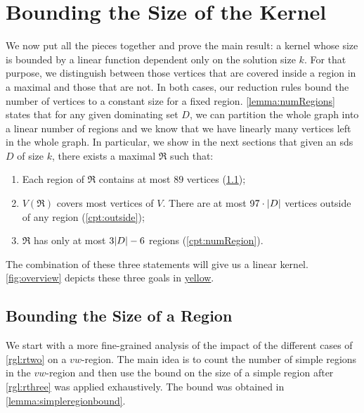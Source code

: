 \section{Bounding the Size of the Kernel}

We now put all the pieces together and prove the main result: a kernel whose size is bounded by a linear function dependent only on the solution size $k$. 
For that purpose, we distinguish between those vertices that are covered inside a region in a maximal \dreg and those that are not. 
In both cases, our reduction rules bound the number of vertices to a constant size for a fixed region.
\cref{lemma:numRegions} states that for any given dominating set $D$, we can partition the whole graph into a linear number of regions and we know that we have linearly many vertices left in the whole graph.
In particular, we show in the next sections that given an sds $D$ of size $k$, there exists a maximal \dreg $\mathfrak{R}$ such that:

\begin{enumerate}[topsep=0pt,itemsep=-1ex,partopsep=1ex,parsep=1ex]
    \item Each region of $\mathfrak{R}$ contains at most $89$ vertices (\cref{chp:sizeRegion});
    \item $V(\mathfrak{R})$ covers most vertices of $V$. There are at most $97 \cdot \abs{D}$ vertices outside of any region (\cref{cpt:outside});
    \item $\mathfrak{R}$ has only at most $3 \abs{D} - 6$ regions (\cref{cpt:numRegion}).
\end{enumerate}

The combination of these three statements will give us a linear kernel. 
\cref{fig:overview} depicts these three goals in {\ul{yellow}}.

\subsection{Bounding the Size of a Region}\label{chp:sizeRegion}

We start with a more fine-grained analysis of the impact of the different cases of \cref{rgl:rtwo} on a $vw$-region. 
The main idea is to count the number of simple regions in the $vw$-region and then use the bound on the size of a simple region after \cref{rgl:rthree} was applied exhaustively. 
The bound was obtained in \cref{lemma:simpleregionbound}.   

